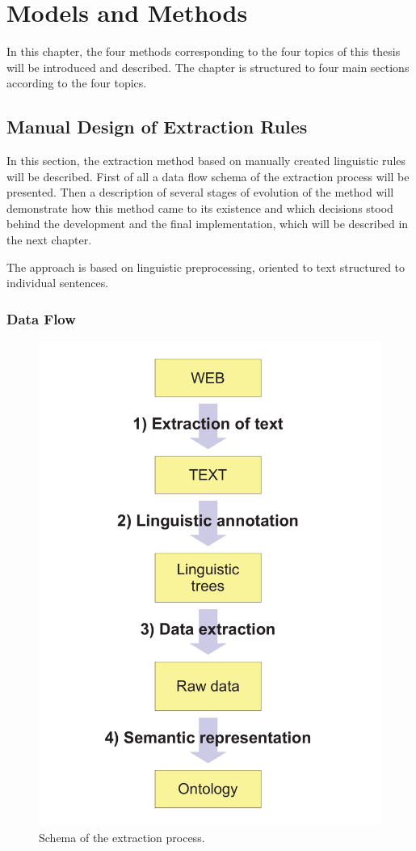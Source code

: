 \chapter{Models and Methods} \label{sec:ch_methods} 

In this chapter, the four methods corresponding to the four topics of this thesis will be introduced and described. The chapter is structured to four main sections according to the four topics. 

\section{Manual Design of Extraction Rules} \label{sec:manual_methods}
\graphicspath{{../img/ch50/}}

In this section, the extraction method based on manually created linguistic rules will be described. First of all a data flow schema of the extraction process will be presented. Then a description of several stages of evolution of the method will demonstrate how this method came to its existence and which decisions stood behind the development and the final implementation, which will be described in the next chapter.

The approach is based on linguistic preprocessing, oriented to text structured to individual sentences. 



\subsection{Data Flow} \label{sec:manual_data_flow}

\begin{figure}
	\centering
		\includegraphics[width=0.2\hsize]{ap_schema}
	\caption{Schema of the extraction process.}
	\label{fig:manual_ap_schema}
\end{figure}



